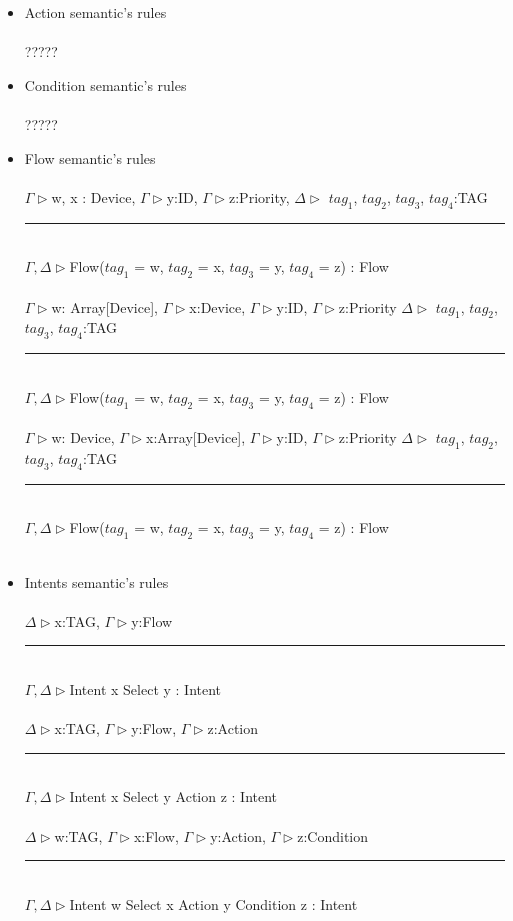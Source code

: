 \documentclass[envcountsect,runningheads]{llncs}
\begin{document}
\begin{itemize}
	\item Action semantic's rules \\
	\\
	?????	
	\\
	\item Condition semantic's rules \\
	\\
	?????	
	\\
	\item Flow semantic's rules \\
	\\
	$\Gamma \rhd$w, x : Device, $\Gamma \rhd$y:ID, $\Gamma \rhd$z:Priority, $\Delta \rhd$ $tag_{1}$, $tag_{2}$, $tag_{3}$, $tag_{4}$:TAG \\
	\noindent\rule{10cm}{0.4pt} \\
	$\Gamma, \Delta \rhd$Flow($tag_{1}$ = w, $tag_{2}$ = x, $tag_{3}$ = y, $tag_{4}$ = z) : Flow\\		
	\\
	$\Gamma \rhd$w: Array[Device], $\Gamma \rhd$x:Device, $\Gamma \rhd$y:ID, $\Gamma \rhd$z:Priority $\Delta \rhd$ $tag_{1}$, $tag_{2}$, $tag_{3}$, $tag_{4}$:TAG \\
	\noindent\rule{10cm}{0.4pt} \\
	$\Gamma, \Delta \rhd$Flow($tag_{1}$ = w, $tag_{2}$ = x, $tag_{3}$ = y, $tag_{4}$ = z) : Flow\\		
	\\
	$\Gamma \rhd$w: Device, $\Gamma \rhd$x:Array[Device], $\Gamma \rhd$y:ID, $\Gamma \rhd$z:Priority $\Delta \rhd$ $tag_{1}$, $tag_{2}$, $tag_{3}$, $tag_{4}$:TAG \\
	\noindent\rule{10cm}{0.4pt} \\
	$\Gamma, \Delta \rhd$Flow($tag_{1}$ = w, $tag_{2}$ = x, $tag_{3}$ = y, $tag_{4}$ = z) : Flow\\		
	\\
	\item Intents semantic's rules \\
	\\
	$\Delta \rhd$x:TAG, $\Gamma \rhd$y:Flow\\
	\noindent\rule{7cm}{0.4pt} \\
	$\Gamma, \Delta \rhd$Intent x Select y : Intent\\		
	\\
	$\Delta \rhd$x:TAG, $\Gamma \rhd$y:Flow, $\Gamma \rhd$z:Action\\
	\noindent\rule{7cm}{0.4pt} \\
	$\Gamma, \Delta \rhd$Intent x Select y Action z : Intent\\		
	\\		
	$\Delta \rhd$w:TAG, $\Gamma \rhd$x:Flow, $\Gamma \rhd$y:Action, $\Gamma \rhd$z:Condition\\
	\noindent\rule{7cm}{0.4pt} \\
	$\Gamma, \Delta \rhd$Intent w Select x Action y Condition z : Intent\\		
	\\		
	
\end{itemize}
\end{document}
